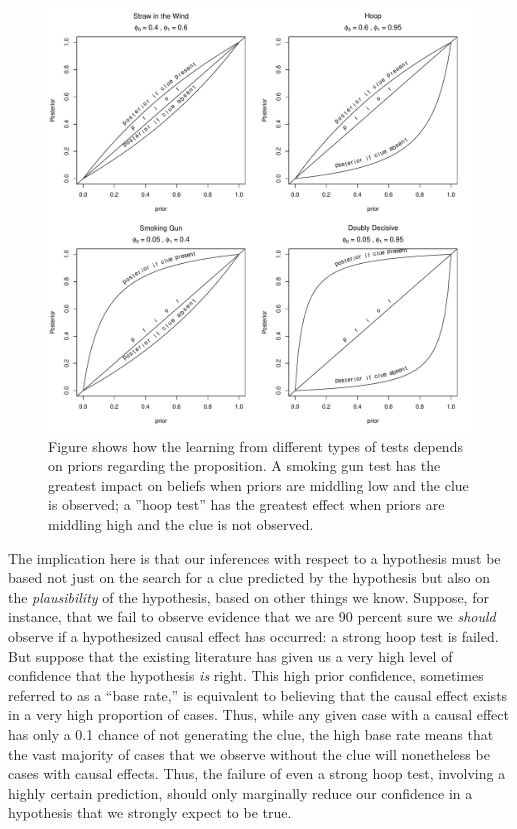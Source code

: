 \documentclass[
  12pt,
]{book}
\begin{document}
\begin{figure}

{\centering \includegraphics{ii_files/figure-latex/CluesInferences2-1} 

}

\caption{Figure shows how the learning from different types of tests depends on priors regarding the proposition. A smoking gun test has the greatest impact on beliefs when priors are middling low and the clue is observed; a ''hoop test'' has the greatest effect when priors are middling high and the clue is not observed.}\label{fig:CluesInferences2}
\end{figure}

The implication here is that our inferences with respect to a hypothesis must be based not just on the search for a clue predicted by the hypothesis but also on the \emph{plausibility} of the hypothesis, based on other things we know. Suppose, for instance, that we fail to observe evidence that we are 90 percent sure we \emph{should} observe if a hypothesized causal effect has occurred: a strong hoop test is failed. But suppose that the existing literature has given us a very high level of confidence that the hypothesis \emph{is} right. This high prior confidence, sometimes referred to as a ``base rate,'' is equivalent to believing that the causal effect exists in a very high proportion of cases. Thus, while any given case with a causal effect has only a 0.1 chance of not generating the clue, the high base rate means that the vast majority of cases that we observe without the clue will nonetheless be cases with causal effects. Thus, the failure of even a strong hoop test, involving a highly certain prediction, should only marginally reduce our confidence in a hypothesis that we strongly expect to be true.
\end{document}

